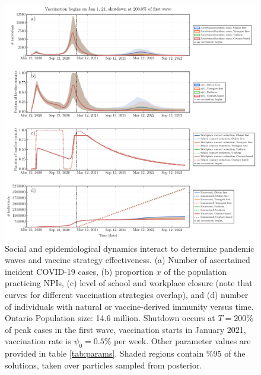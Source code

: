 \begin{figure}
\includegraphics[width=\textwidth]{chapter_1/ts_plot.pdf}
\caption[Social and epidemiological dynamics interact to determine pandemic waves and vaccine strategy effectiveness.]{Social and epidemiological dynamics interact to determine pandemic waves and vaccine strategy effectiveness. (a) Number of ascertained incident COVID-19 cases, (b) proportion $x$ of the population practicing NPIs, (c) level of school and workplace closure (note that curves for different vaccination strategies overlap), and (d) number of individuals with natural or vaccine-derived immunity versus time.  Ontario Population size: 14.6 million. Shutdown occurs at $T = 200$\% of peak cases in the first wave, vaccination starts in January 2021, vaccination rate is $\psi_0 =0.5\%$ per week. Other parameter values are provided in table \ref{tab:params}. Shaded regions contain \%95 of the solutions, taken over particles sampled from posterior.}
\label{fig2}  
\end{figure}

